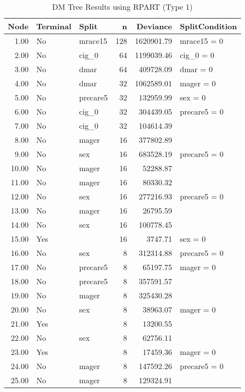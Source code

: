 \begingroup\small
\begin{longtable}{rllrrl}
  \caption{DM Tree Results using RPART (Type 1)}\label{tab:rpart_results_type1}\\
 \hline
Node & Terminal & Split & n & Deviance & SplitCondition \\ 
  \hline
1.00 & No & mrace15 & 128 & 1620901.79 & mrace15 = 0 \\ 
  2.00 & No & cig_0 &  64 & 1199039.46 & cig_0 = 0 \\ 
  3.00 & No & dmar &  64 & 409728.09 & dmar = 0 \\ 
  4.00 & No & dmar &  32 & 1062589.01 & mager = 0 \\ 
  5.00 & No & precare5 &  32 & 132959.99 & sex = 0 \\ 
  6.00 & No & cig_0 &  32 & 304439.05 & precare5 = 0 \\ 
  7.00 & No & cig_0 &  32 & 104614.39 &  \\ 
  8.00 & No & mager &  16 & 377802.89 &  \\ 
  9.00 & No & sex &  16 & 683528.19 & precare5 = 0 \\ 
  10.00 & No & mager &  16 & 52288.87 &  \\ 
  11.00 & No & mager &  16 & 80330.32 &  \\ 
  12.00 & No & sex &  16 & 277216.93 & precare5 = 0 \\ 
  13.00 & No & mager &  16 & 26795.59 &  \\ 
  14.00 & No & sex &  16 & 100778.45 &  \\ 
  15.00 & Yes &  &  16 & 3747.71 & sex = 0 \\ 
  16.00 & No & sex &   8 & 312314.88 & precare5 = 0 \\ 
  17.00 & No & precare5 &   8 & 65197.75 & mager = 0 \\ 
  18.00 & No & precare5 &   8 & 357591.57 &  \\ 
  19.00 & No & mager &   8 & 325430.28 &  \\ 
  20.00 & No & sex &   8 & 38963.07 & mager = 0 \\ 
  21.00 & Yes &  &   8 & 13200.55 &  \\ 
  22.00 & No & sex &   8 & 62756.11 &  \\ 
  23.00 & Yes &  &   8 & 17459.36 & mager = 0 \\ 
  24.00 & No & mager &   8 & 147592.26 & precare5 = 0 \\ 
  25.00 & No & mager &   8 & 129324.91 &  \\ 

\end{longtable}

